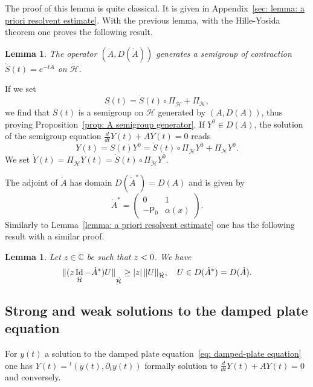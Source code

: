 \documentclass[10pt]{amsart}
\theoremstyle{plain}
\newtheorem{lemma}[theorem]{Lemma}
\theoremstyle{definition}
\def\C{\mathbb{C}}
\let \Re \relax
\DeclareMathOperator{\Re}{Re}
\renewcommand{\H}{{\mathcal H}}
\newcommand{\transp}{\ensuremath{\phantom{}^{t}}}
\newcommand{\Norm}[2]{{\| #1 \|}_{#2}}
\newcommand{\Pell}{\mathsf P_0}
\DeclareMathOperator{\id}{Id}
\begin{document}
The proof of this lemma is quite classical. It is given in
Appendix~\ref{sec: lemma: a priori resolvent estimate}.
With the previous lemma, with the Hille-Yosida theorem one
proves the following result.

\begin{lemma}
\label{lemma: reduced generator}
The operator $(\dot A, D(\dot A))$ generates a semigroup of
contraction
$\dot S(t) = e^{- t \dot A}$ on $\dot{\H}$.
\end{lemma}
If we set
\begin{equation}
\label{eq: semigroup}
S(t) = \dot{S}(t) \circ \Pi_{\dot{\H}} + \Pi_{\mathcal N},
\end{equation}
we find that $S(t)$ is a semigroup on $\H$ generated by $(A,D(A))$,
thus proving Proposition~\ref{prop: A semigroup generator}.
If $Y^0 \in D(A)$, the solution of the semigroup equation
$\frac{d}{d t} Y(t) + A Y(t) =0$ reads
\begin{equation}
\label{eq: semigroup solution}
Y(t)= S(t) Y^0= \dot{S}(t) \circ \Pi_{\dot{\H}} Y^0 +
\Pi_{\mathcal N} Y^0.
\end{equation}
We set $\dot{Y}(t) = \Pi_{\dot{\H}} Y(t) = \dot{S}(t) \circ \Pi_{\dot{\H}} Y^0$.

The adjoint of $\dot A$ has domain $D(\dot A^*) = D(A)$ and is given
by
\begin{equation*}
\dot A^* = \begin{pmatrix} 0 & 1\\ -\Pell & \alpha(x) \end{pmatrix}.
\end{equation*}
Similarly to Lemma~\ref{lemma: a priori resolvent estimate} one has
the following result with a similar proof.
\begin{lemma}
\label{lemma: a priori resolvent estimate bis}
Let $z \in \C$ be such that $\Re z<0$. We have
\begin{equation*}
\Norm{(z \id_{\dot{\H}} - \dot A^*) U}{\dot{\H}} \geq |\Re z| \,
\Norm{U}{\dot{\H}}, \quad U \in D(\dot A^*) = D(\dot A).
\end{equation*}
\end{lemma}

\subsection{Strong and weak solutions to the damped plate equation}
\label{sec: Strong and weak solutions}
For $y(t)$ a solution to the damped plate equation~\eqref{eq:
damped-plate equation} one has $Y(t) = \transp(y(t), \partial_t y(t))$
formally solution to $\frac{d}{d t} Y(t) + A Y(t) =0$ and conversely.
\end{document}
